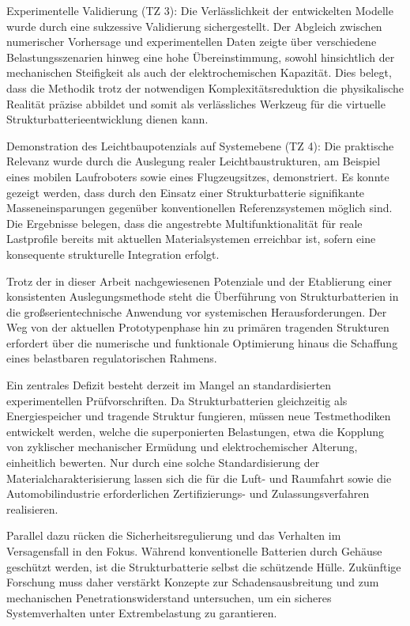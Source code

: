 Experimentelle Validierung (TZ 3): Die Verlässlichkeit der entwickelten Modelle wurde durch eine sukzessive Validierung sichergestellt. Der Abgleich zwischen numerischer Vorhersage und experimentellen Daten zeigte über verschiedene Belastungsszenarien hinweg eine hohe Übereinstimmung, sowohl hinsichtlich der mechanischen Steifigkeit als auch der elektrochemischen Kapazität. Dies belegt, dass die Methodik trotz der notwendigen Komplexitätsreduktion die physikalische Realität präzise abbildet und somit als verlässliches Werkzeug für die virtuelle Strukturbatterieentwicklung dienen kann.

Demonstration des Leichtbaupotenzials auf Systemebene (TZ 4): Die praktische Relevanz wurde durch die Auslegung realer Leichtbaustrukturen, am Beispiel eines mobilen Laufroboters sowie eines Flugzeugsitzes, demonstriert. Es konnte gezeigt werden, dass durch den Einsatz einer Strukturbatterie signifikante Masseneinsparungen gegenüber konventionellen Referenzsystemen möglich sind. Die Ergebnisse belegen, dass die angestrebte Multifunktionalität für reale Lastprofile bereits mit aktuellen Materialsystemen erreichbar ist, sofern eine konsequente strukturelle Integration erfolgt.


Trotz der in dieser Arbeit nachgewiesenen Potenziale und der Etablierung einer konsistenten Auslegungsmethode steht die Überführung von Strukturbatterien in die großserientechnische Anwendung vor systemischen Herausforderungen. Der Weg von der aktuellen Prototypenphase hin zu primären tragenden Strukturen erfordert über die numerische und funktionale Optimierung hinaus die Schaffung eines belastbaren regulatorischen Rahmens.

Ein zentrales Defizit besteht derzeit im Mangel an standardisierten experimentellen Prüfvorschriften. Da Strukturbatterien gleichzeitig als Energiespeicher und tragende Struktur fungieren, müssen neue Testmethodiken entwickelt werden, welche die superponierten Belastungen, etwa die Kopplung von zyklischer mechanischer Ermüdung und elektrochemischer Alterung, einheitlich bewerten. Nur durch eine solche Standardisierung der Materialcharakterisierung lassen sich die für die Luft- und Raumfahrt sowie die Automobilindustrie erforderlichen Zertifizierungs- und Zulassungsverfahren realisieren.

Parallel dazu rücken die Sicherheitsregulierung und das Verhalten im Versagensfall in den Fokus. Während konventionelle Batterien durch Gehäuse geschützt werden, ist die Strukturbatterie selbst die schützende Hülle. Zukünftige Forschung muss daher verstärkt Konzepte zur Schadensausbreitung und zum mechanischen Penetrationswiderstand untersuchen, um ein sicheres Systemverhalten unter Extrembelastung zu garantieren.

